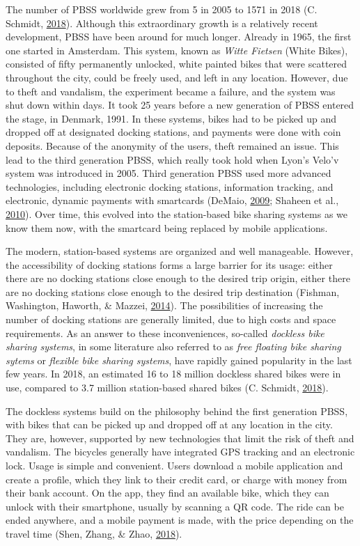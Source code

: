 \documentclass[12pt,oneside]{reedthesis}
\begin{document}
The number of PBSS worldwide grew from 5 in 2005 to 1571 in 2018 (C.
Schmidt, \protect\hyperlink{ref-schmidt2018}{2018}). Although this
extraordinary growth is a relatively recent development, PBSS have been
around for much longer. Already in 1965, the first one started in
Amsterdam. This system, known as \emph{Witte Fietsen} (White Bikes),
consisted of fifty permanently unlocked, white painted bikes that were
scattered throughout the city, could be freely used, and left in any
location. However, due to theft and vandalism, the experiment became a
failure, and the system was shut down within days. It took 25 years
before a new generation of PBSS entered the stage, in Denmark, 1991. In
these systems, bikes had to be picked up and dropped off at designated
docking stations, and payments were done with coin deposits. Because of
the anonymity of the users, theft remained an issue. This lead to the
third generation PBSS, which really took hold when Lyon's Velo'v system
was introduced in 2005. Third generation PBSS used more advanced
technologies, including electronic docking stations, information
tracking, and electronic, dynamic payments with smartcards (DeMaio,
\protect\hyperlink{ref-demaio2009}{2009}; Shaheen et al.,
\protect\hyperlink{ref-shaheen2010}{2010}). Over time, this evolved into
the station-based bike sharing systems as we know them now, with the
smartcard being replaced by mobile applications.

The modern, station-based systems are organized and well manageable.
However, the accessibility of docking stations forms a large barrier for
its usage: either there are no docking stations close enough to the
desired trip origin, either there are no docking stations close enough
to the desired trip destination (Fishman, Washington, Haworth, \&
Mazzei, \protect\hyperlink{ref-fishman2014}{2014}). The possibilities of
increasing the number of docking stations are generally limited, due to
high costs and space requirements. As an answer to these inconveniences,
so-called \emph{dockless bike sharing systems}, in some literature also
referred to as \emph{free floating bike sharing sytems} or
\emph{flexible bike sharing systems}, have rapidly gained popularity in
the last few years. In 2018, an estimated 16 to 18 million dockless
shared bikes were in use, compared to 3.7 million station-based shared
bikes (C. Schmidt, \protect\hyperlink{ref-schmidt2018}{2018}).

The dockless systems build on the philosophy behind the first generation
PBSS, with bikes that can be picked up and dropped off at any location
in the city. They are, however, supported by new technologies that limit
the risk of theft and vandalism. The bicycles generally have integrated
GPS tracking and an electronic lock. Usage is simple and convenient.
Users download a mobile application and create a profile, which they
link to their credit card, or charge with money from their bank account.
On the app, they find an available bike, which they can unlock with
their smartphone, usually by scanning a QR code. The ride can be ended
anywhere, and a mobile payment is made, with the price depending on the
travel time (Shen, Zhang, \& Zhao,
\protect\hyperlink{ref-shen2018}{2018}).
\end{document}

